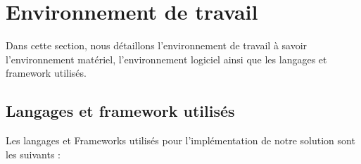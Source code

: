 
\section{Environnement de travail}
Dans cette section, nous détaillons l'environnement de travail à savoir l'environnement matériel, l'environnement logiciel ainsi que les langages et framework utilisés.

\subsection{ Langages et framework utilisés }
\noindent Les langages et Frameworks utilisés pour l'implémentation de notre solution sont les suivants :

